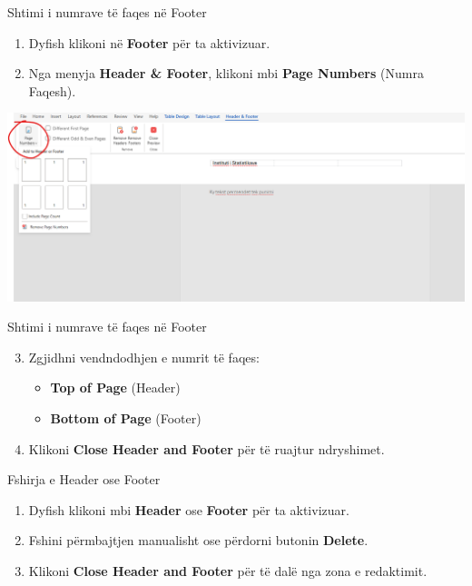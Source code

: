 \documentclass[
  ignorenonframetext,
]{beamer}
\begin{document}
\begin{frame}{Shtimi i numrave të faqes në Footer}
\label{shtimi-i-numrave-tuxeb-faqes-nuxeb-footer}
\begin{enumerate}
\item
  Dyfish klikoni në \textbf{Footer} për ta aktivizuar.
\item
  Nga menyja \textbf{Header \& Footer}, klikoni mbi \textbf{Page
  Numbers} (Numra Faqesh).
\end{enumerate}

\includegraphics{./images/word18.png}
\end{frame}

\begin{frame}{Shtimi i numrave të faqes në Footer}
\label{shtimi-i-numrave-tuxeb-faqes-nuxeb-footer-1}
\begin{enumerate}
\setcounter{enumi}{2}
\item
  Zgjidhni vendndodhjen e numrit të faqes:

  \begin{itemize}
  \item
    \textbf{Top of Page} (Header)
  \item
    \textbf{Bottom of Page} (Footer)
  \end{itemize}
\item
  Klikoni \textbf{Close Header and Footer} për të ruajtur ndryshimet.
\end{enumerate}
\end{frame}

\begin{frame}{Fshirja e Header ose Footer}
\label{fshirja-e-header-ose-footer}
\begin{enumerate}
\item
  Dyfish klikoni mbi \textbf{Header} ose \textbf{Footer} për ta
  aktivizuar.
\item
  Fshini përmbajtjen manualisht ose përdorni butonin \textbf{Delete}.
\item
  Klikoni \textbf{Close Header and Footer} për të dalë nga zona e
  redaktimit.
\end{enumerate}
\end{frame}
\end{document}
